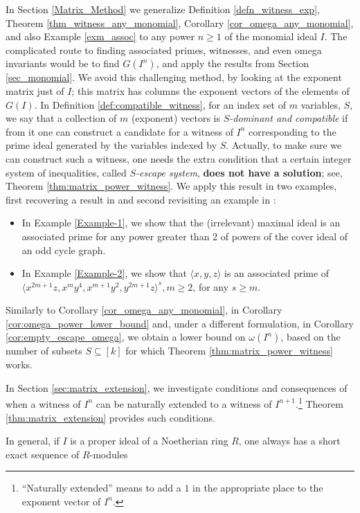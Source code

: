 \documentclass[11pt]{amsart}   %
\begin{document}
In Section \ref{Matrix_Method} we generalize Definition \ref{defn_witness_exp}, Theorem \ref{thm_witness_any_monomial}, Corollary \ref{cor_omega_any_monomial}, and also Example \ref{exm_assoc} to any power $n\geq 1$ of the monomial ideal $I$. The complicated route to finding associated primes, witnesses, and even omega invariants would be to find $G(I^n)$, and apply the results from Section \ref{sec_monomial}. We avoid this challenging method, by looking at the exponent matrix just of $I$; this matrix has columns the exponent vectors of the elements of $G(I)$. In Definition \ref{def:compatible_witness}, for an index set of $m$ variables, $S$, we say that a collection of $m$ (exponent) vectors is {\em $S$-dominant and compatible} if from it one can construct a candidate for a witness of $I^n$ corresponding to the prime ideal generated by the variables indexed by $S$. Actually, to make sure we can construct such a witness, one needs the extra condition that a certain integer system of inequalities, called {\em $S$-escape system}, {\bf does not have a solution}; see, Theorem \ref{thm:matrix_power_witness}. We apply this result in two examples, first recovering a result in \cite{NKA} and second revisiting an example in \cite{CNQ}: 
\begin{itemize}
    \item[-] In Example \ref{Example-1}, we show that the (irrelevant) maximal ideal is an associated prime for any power greater than 2 of powers of the cover ideal of an odd cycle graph.
    \item[-] In Example \ref{Example-2}, we show that $\langle x,y,z\rangle$ is an associated prime of $\langle x^{2m+1}z, x^my^4, x^{m+1}y^2, y^{2m+1}z\rangle^s, m\geq 2$, for any $s\geq m$.
\end{itemize}
Similarly to Corollary \ref{cor_omega_any_monomial}, in Corollary \ref{cor:omega_power_lower_bound} and, under a different formulation, in Corollary \ref{cor:empty_escape_omega}, we obtain a lower bound on $\omega(I^n)$, based on the number of subsets $S\subseteq[k]$ for which Theorem \ref{thm:matrix_power_witness} works.

In Section \ref{sec:matrix_extension}, we investigate conditions and consequences of when a witness of $I^n$ can be naturally extended to a witness of $I^{n+1}$.\footnote{``Naturally extended'' means to add a $1$ in the appropriate place to the exponent vector of $I^n$.} Theorem \ref{thm:matrix_extension} provides such conditions.

In general, if $I$ is a proper ideal of a Noetherian ring $R$, one always has a short exact sequence of $R$-modules
\end{document}
